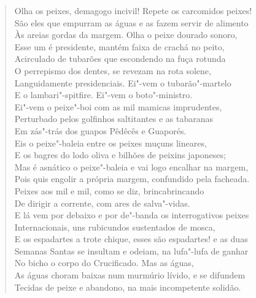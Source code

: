 {\begin{verse}
Olha os peixes, demagogo incivil! Repete os carcomidos peixes!\\
São eles que empurram as águas e as fazem servir de alimento\\
Às areias gordas da margem. Olha o peixe dourado sonoro,\\
Esse um é presidente, mantém faixa de crachá no peito,\\
Acirculado de tubarões que escondendo na fuça rotunda\\
O perrepismo dos dentes, se revezam na rota solene,\\
Languidamente presidenciais. Ei"-vem o tubarão"-martelo\\
E o lambari"-spitfire. Ei"-vem o boto"-ministro.\\
Ei"-vem o peixe"-boi com as mil mamicas imprudentes,\\
Perturbado pelos golfinhos saltitantes e as tabaranas\\
Em zás"-trás dos guapos Pêdêcês e Guaporés.\\
Eis o peixe"-baleia entre os peixes muçuns lineares,\\
E os bagres do lodo oliva e bilhões de peixins japoneses;\\
Mas é asnático o peixe"-baleia e vai logo encalhar na margem,\\
Pois quis engolir a própria margem, confundido pela facheada.\\
Peixes aos mil e mil, como se diz, brincabrincando\\
De dirigir a corrente, com ares de salva"-vidas.\\
E lá vem por debaixo e por de"-banda os interrogativos peixes\\
Internacionais, uns rubicundos sustentados de mosca,\\
E os espadartes a trote chique, esses são espadartes! e as duas\\
Semanas Santas se insultam e odeiam, na lufa"-lufa de ganhar\\
No bicho o corpo do Crucificado. Mas as águas,\\
As águas choram baixas num murmúrio lívido, e se difundem\\
Tecidas de peixe e abandono, na mais incompetente solidão.


\end{verse}}
